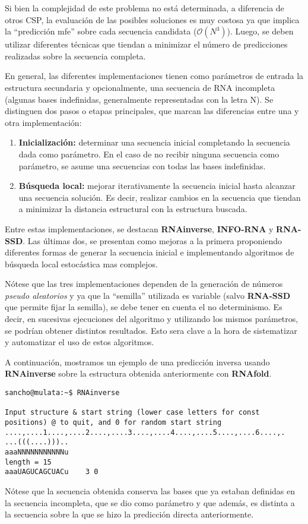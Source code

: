 Si bien la complejidad de este problema no est\'a determinada, a diferencia de
otros \ac{CSP}, la evaluaci\'on de las posibles soluciones es muy costosa ya que
implica la ``predicci\'on \ac{mfe}'' sobre cada secuencia candidata
($\mathcal{O}(N^{3})$). Luego, se deben utilizar diferentes t\'ecnicas que
tiendan a minimizar el n\'umero de predicciones realizadas sobre la secuencia
completa.

En general, las diferentes implementaciones tienen como par\'ametros de
entrada la estructura secundaria y opcionalmente, una secuencia de \ac{RNA}
incompleta (algunas bases indefinidas, generalmente representadas con la
letra N). Se distinguen dos pasos o etapas principales, que marcan las
diferencias entre una y otra implementaci\'on:
\begin{enumerate}
 \item \textbf{Inicializaci\'on:} determinar una secuencia inicial completando
la secuencia dada como par\'ametro. En el caso de no recibir ninguna secuencia
como par\'ametro, se asume una secuencias con todas las bases indefinidas.
 \item \textbf{B\'usqueda local:} mejorar iterativamente la secuencia inicial
hasta alcanzar una secuencia soluci\'on. Es decir, realizar cambios en la
secuencia que tiendan a minimizar la distancia estructural con la estructura
buscada.
\end{enumerate}

Entre estas implementaciones, se destacan \textbf{RNAinverse}\cite{Hofacker94},
\textbf{INFO-RNA}\cite{Busch07} y \textbf{RNA-SSD}\cite{Andronescu03}. Las
\'ultimas dos, se presentan como mejoras a la primera proponiendo diferentes
formas de generar la secuencia inicial e implementando algoritmos de b\'usqueda
local estoc\'astica mas complejos.

N\'otese que las tres implementaciones dependen de la generaci\'on de n\'umeros
\textit{pseudo aleatorios} y ya que la ``semilla'' utilizada es variable (salvo
\textbf{RNA-SSD} que permite fijar la semilla), se debe tener en cuenta el no
determinismo. Es decir, en sucesivas ejecuciones del algoritmo y utilizando los
mismos par\'ametros, se podr\'ian obtener distintos resultados. Esto sera clave
a la hora de sistematizar y automatizar el uso de estos algoritmos.

A continuaci\'on, mostramos un ejemplo de una predicci\'on inversa usando
\textbf{RNAinverse} sobre la estructura obtenida anteriormente con
\textbf{RNAfold}.

\begin{verbatim}
sancho@mulata:~$ RNAinverse 

Input structure & start string (lower case letters for const 
positions) @ to quit, and 0 for random start string
....,....1....,....2....,....3....,....4....,....5....,....6....,.
...(((....)))..
aaaNNNNNNNNNNNu
length = 15
aaaUAGUCAGCUACu    3 0
\end{verbatim}

N\'otese que la secuencia obtenida conserva las bases que ya estaban definidas
en la secuencia incompleta, que se dio como par\'ametro y que adem\'as, es
distinta a la secuencia sobre la que se hizo la predicci\'on directa
anteriormente.
